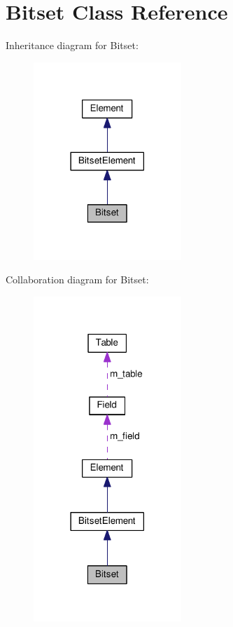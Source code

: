 \hypertarget{classBitset}{}\section{Bitset Class Reference}
\label{classBitset}


Inheritance diagram for Bitset\+:\nopagebreak
\begin{figure}[H]
\begin{center}
\leavevmode
\includegraphics[width=158pt]{classBitset__inherit__graph}
\end{center}
\end{figure}


Collaboration diagram for Bitset\+:\nopagebreak
\begin{figure}[H]
\begin{center}
\leavevmode
\includegraphics[width=158pt]{classBitset__coll__graph}
\end{center}
\end{figure}

